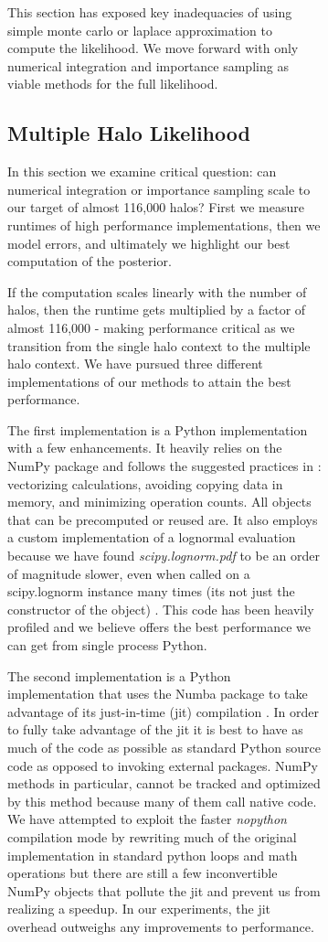 \documentclass[\docopts]{\docclass}
\begin{document}
\begin{figure}[h!]
\begin{figure}[h!]
This section has exposed key inadequacies of using simple monte carlo or laplace approximation to compute the likelihood. We move forward with only numerical integration and importance sampling as viable methods for the full likelihood.

\subsection{Multiple Halo Likelihood}
\label{subsec:multiple_halos}

In this section we examine critical question: can numerical integration or importance sampling scale to our target of almost 116,000 halos? First we measure runtimes of high performance implementations, then we model errors, and ultimately we highlight our best computation of the posterior.

If the computation scales linearly with the number of halos, then the runtime gets multiplied by a factor of almost 116,000 - making performance critical as we transition from the single halo context to the multiple halo context. We have pursued three different implementations of our methods to attain the best performance. 

The first implementation is a Python implementation with a few enhancements. It heavily relies on the NumPy package and follows the suggested practices in \citealt{numpy}: vectorizing calculations, avoiding copying data in memory, and minimizing operation counts. All objects that can be precomputed or reused are. It also employs a custom implementation of a lognormal evaluation because we have found \emph{scipy.lognorm.pdf} to be an order of magnitude slower, even when called on a scipy.lognorm instance many times (its not just the constructor of the object) \citep*{scipy}. This code has been heavily profiled and we believe offers the best performance we can get from single process Python.

The second implementation is a Python implementation that uses the Numba package to take advantage of its just-in-time (jit) compilation \citep*{numba}. In order to fully take advantage of the jit it is best to have as much of the code as possible as standard Python source code as opposed to invoking external packages. NumPy methods in particular, cannot be tracked and optimized by this method because many of them call native code. We have attempted to exploit the faster \emph{nopython} compilation mode by rewriting much of the original implementation in standard python loops and math operations but there are still a few inconvertible NumPy objects that pollute the jit and prevent us from realizing a speedup. In our experiments, the jit overhead outweighs any improvements to performance.


\end{figure}
\end{figure}
\end{document}
